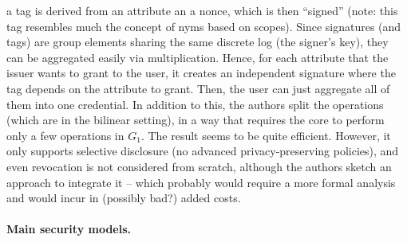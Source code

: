 \begin{enumerate}
  a tag is derived from an attribute an a nonce, which is then ``signed'' (note:
  this tag resembles much the concept of nyms based on scopes). Since signatures
  (and tags) are group elements sharing the same discrete log (the signer's key),
  they can be aggregated easily via multiplication. Hence, for each attribute that
  the issuer wants to grant to the user, it creates an independent signature where
  the tag depends on the attribute to grant. Then, the user can just aggregate
  all of them into one credential. In addition to this, the authors split the
  operations (which are in the bilinear setting), in a way that requires the
  core to perform only a few operations in $G_1$. The result seems to be quite
  efficient. However, it only supports selective disclosure (no advanced
  privacy-preserving policies), and even revocation is not considered from scratch,
  although the authors sketch an approach to integrate it -- which probably
  would require a more formal analysis and would incur in (possibly bad?)
  added costs.
\end{enumerate}

\paragraph{Main security models.}

